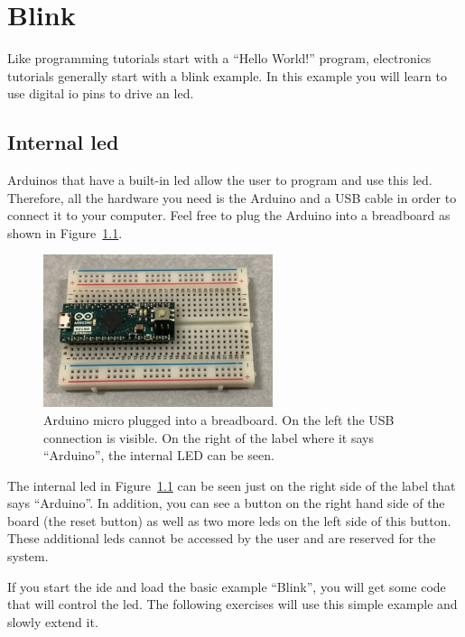 
\chapter{Blink}

Like programming tutorials start with a ``Hello World!'' program, electronics tutorials generally start with a blink example. In this example you will learn to use digital \ac{io} pins to drive an \ac{led}. 

\section{Internal \ac{led}}

Arduinos that have a built-in \ac{led} allow the user to program and use this \ac{led}. Therefore, all the hardware you need is the Arduino and a USB cable in order to connect it to your computer. Feel free to plug the Arduino into a breadboard as shown in Figure~\ref{fig:blink:arduino_alone}.
\begin{figure}[htb]
    \centering
    \includegraphics[width=0.6\textwidth]{graphics/01_blink/arduino_alone.jpg}
    \caption{Arduino micro plugged into a breadboard. On the left the USB connection is visible. On the right of the label where it says ``Arduino'', the internal LED can be seen.}
    \label{fig:blink:arduino_alone}
\end{figure}
The internal \ac{led} in Figure~\ref{fig:blink:arduino_alone} can be seen just on the right side of the label that says ``Arduino''. In addition, you can see a button on the right hand side of the board (the reset button) as well as two more \acp{led} on the left side of this button. These additional \acp{led} cannot be accessed by the user and are reserved for the system.

If you start the \ac{ide} and load the basic example ``Blink'', you will get some code that will control the \ac{led}. The following exercises will use this simple example and slowly extend it.

